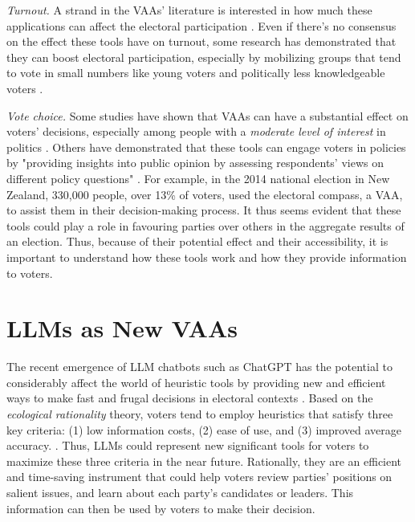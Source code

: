 \documentclass{article}
\begin{document}
\textit{Turnout.} A strand in the VAAs' literature is interested in how much these applications can affect the electoral participation \parencite{germann_gemenis19, stadelmann-steffen_etal22}. Even if there's no consensus on the effect these tools have on turnout, some research has demonstrated that they can boost electoral participation, especially by mobilizing groups that tend to vote in small numbers like young voters and politically less knowledgeable voters \parencite{gemenis_rosema14}.

\textit{Vote choice.} Some studies have shown that VAAs can have a substantial effect on voters' decisions, especially among people with a \textit{moderate level of interest} in politics \parencite{tromborg_albertsen23}. Others have demonstrated that these tools can engage voters in policies by "providing insights into public opinion by assessing respondents' views on different policy questions" \parencite{lees-marshment_etal15}. For example, in the 2014 national election in New Zealand, 330,000 people, over 13\% of voters, used the electoral compass, a VAA, to assist them in their decision-making process. It thus seems evident that these tools could play a role in favouring parties over others in the aggregate results of an election. Thus, because of their potential effect and their accessibility, it is important to understand how these tools work and how they provide information to voters.

\section{LLMs as New VAAs}
The recent emergence of LLM chatbots such as ChatGPT has the potential to considerably affect the world of heuristic tools by providing new and efficient ways to make fast and frugal decisions in electoral contexts \parencite{kim_lee23}. Based on the \textit{ecological rationality} theory, voters tend to employ heuristics that satisfy three key criteria: (1) low information costs, (2) ease of use, and (3) improved average accuracy. \parencite{tromborg_albertsen23}. Thus, LLMs could represent new significant tools for voters to maximize these three criteria in the near future. Rationally, they are an efficient and time-saving instrument that could help voters review parties' positions on salient issues, and learn about each party's candidates or leaders. This information can then be used by voters to make their decision. \par
\end{document}
